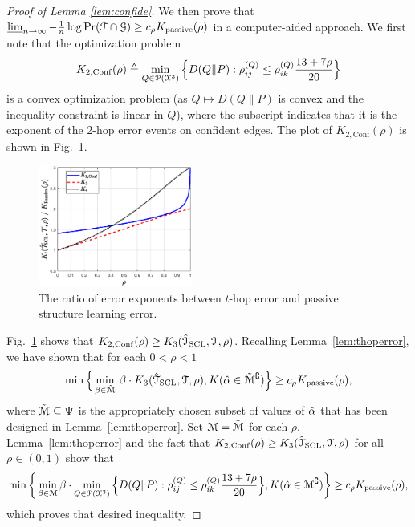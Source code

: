\begin{proof}[Proof of Lemma \ref{lem:confide}]
	We then prove that $\varliminf_{n\rightarrow\infty} -\frac{1}{n}\log\Pr(\mathcal{F}\cap \mathcal{G})\geq c_{\rho}K _{{\rm passive}}(\rho)$ in a computer-aided approach. We first note that the optimization problem 
	\begin{align}
	K_{2,\mathrm{Conf}}(\rho)\triangleq\min_{Q\in\mathcal{P}(\mathcal{X}^{3})}    \Big\{D(Q\|P):\rho^{(Q)}_{ij}\leq\rho^{(Q)}_{ik}\frac{13+7\rho}{20}\Big\}
	\end{align}
	is a convex optimization problem (as $Q\mapsto D(Q\|P)$ is convex and the inequality constraint is linear in $Q$), where the subscript indicates that it is the exponent of the 2-hop error events on confident edges. The plot of $K_{2,\mathrm{Conf}}(\rho)$ is shown in Fig.~\ref{fig:thoperr_1}.
	
	\begin{figure}[t]
		\centering 
		\includegraphics[width=0.45\textwidth]{thoperror_1.eps} 
		\caption{The ratio of error exponents between $t$-hop error and passive structure learning error.} 
		\label{fig:thoperr_1} 
	\end{figure}

	Fig.~\ref{fig:thoperr_1} shows that $K_{2,\mathrm{Conf}}(\rho)\geq K_{3}(\hat{\mathcal{T}}_{{\rm SCL}},\mathcal{T},\rho)$. Recalling Lemma~\ref{lem:thoperror}, we have shown that for each $0<\rho<1$
	\begin{align}
	    \min\Big\{\min_{\beta\in \tilde{\mathcal{M}} }\,\beta \cdot K _{3}(\hat{\mathcal{T}}_{{\rm SCL}},\mathcal{T},\rho),K (\hat{\alpha}\in \tilde{\mathcal{M}}^{\complement})\Big\}\geq c_{\rho}K_{{\rm passive}}(\rho),
	\end{align}
	where $\tilde{\mathcal{M}}\subseteq \Psi$ is the appropriately chosen subset of values of $\hat{\alpha}$ that has been designed in Lemma~\ref{lem:thoperror}. 
	Set $\mathcal{M}=\tilde{\mathcal{M}}$ for each $\rho$. Lemma~\ref{lem:thoperror} and the fact that $K_{2,\mathrm{Conf}}(\rho)\geq K _{3}(\hat{\mathcal{T}}_{{\rm SCL}},\mathcal{T},\rho)$ for all $\rho\in(0,1)$ show that
	\begin{align}
	    \min\bigg\{\min_{\beta\in \mathcal{M}} \beta\cdot \min_{Q\in\mathcal{P}(\mathcal{X}^{3})} \Big\{D(Q\|P):\rho^{(Q)}_{ij}\leq\rho^{(Q)}_{ik}\frac{13+7\rho}{20}\Big\},K (\hat{\alpha}\in \mathcal{M}^{\complement})\bigg\}\geq c_{\rho}K_{{\rm passive}}(\rho),
	\end{align}
	which proves that desired inequality.
\end{proof}

